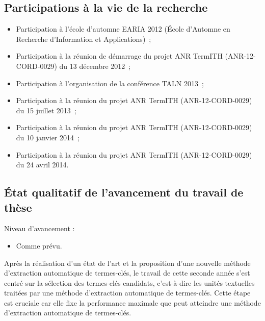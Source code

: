 



    \subsection{Participations à la vie de la recherche}
      \begin{itemize}
        \item{Participation à l'école d'automne EARIA 2012 (École d'Automne en
              Recherche d'Information et Applications)~;}
        \item{Participation à la réunion de démarrage du projet ANR TermITH
              (ANR-12-CORD-0029) du 13 décembre 2012~;}
        \item{Participation à l'organisation de la conférence TALN 2013~;}
        \item{Participation à la réunion du projet ANR TermITH (ANR-12-CORD-0029) du
              15 juillet 2013~;}
        \item{Participation à la réunion du projet ANR TermITH (ANR-12-CORD-0029) du
              10 janvier 2014~;}
        \item{Participation à la réunion du projet ANR TermITH (ANR-12-CORD-0029) du
              24 avril 2014.}
      \end{itemize}


    \subsection{État qualitatif de l'avancement du travail de thèse}
      Niveau d'avancement :
      \begin{itemize}
        \item{Comme prévu.}
      \end{itemize}

      Après la réalisation d'un état de l'art et la proposition d'une nouvelle
      méthode d'extraction automatique de termes-clés, le travail de cette
      seconde année s'est centré sur la sélection des termes-clés candidats,
      c'est-à-dire les unités textuelles traitées par une méthode d'extraction
      automatique de termes-clés. Cette étape est cruciale car elle fixe la
      performance maximale que peut atteindre une méthode d'extraction
      automatique de termes-clés.

